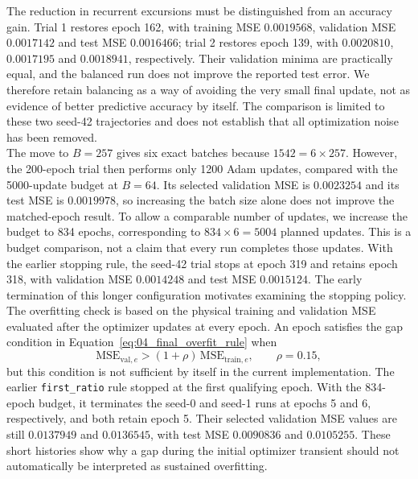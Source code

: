 The reduction in recurrent excursions must be distinguished from an accuracy gain. Trial 1 restores epoch 162, with training MSE $0.0019568$, validation MSE $0.0017142$ and test MSE $0.0016466$; trial 2 restores epoch 139, with $0.0020810$, $0.0017195$ and $0.0018941$, respectively. Their validation minima are practically equal, and the balanced run does not improve the reported test error. We therefore retain balancing as a way of avoiding the very small final update, not as evidence of better predictive accuracy by itself. The comparison is limited to these two seed-42 trajectories and does not establish that all optimization noise has been removed.\\

The move to $B=257$ gives six exact batches because $1542=6\times257$. However, the 200-epoch trial then performs only 1200 Adam updates, compared with the 5000-update budget at $B=64$. Its selected validation MSE is $0.0023254$ and its test MSE is $0.0019978$, so increasing the batch size alone does not improve the matched-epoch result. To allow a comparable number of updates, we increase the budget to 834 epochs, corresponding to $834\times6=5004$ planned updates. This is a budget comparison, not a claim that every run completes those updates. With the earlier stopping rule, the seed-42 trial stops at epoch 319 and retains epoch 318, with validation MSE $0.0014248$ and test MSE $0.0015124$. The early termination of this longer configuration motivates examining the stopping policy.\\

The overfitting check is based on the physical training and validation MSE evaluated after the optimizer updates at every epoch. An epoch satisfies the gap condition in Equation~\eqref{eq:04_final_overfit_rule} when
\begin{equation}
    \mathrm{MSE}_{\mathrm{val},e}
    > (1+\rho)\,\mathrm{MSE}_{\mathrm{train},e},
    \qquad \rho=0.15,
    \label{eq:04_final_overfit_rule}
\end{equation}
but this condition is not sufficient by itself in the current implementation. The earlier \texttt{first\_ratio} rule stopped at the first qualifying epoch. With the 834-epoch budget, it terminates the seed-0 and seed-1 runs at epochs 5 and 6, respectively, and both retain epoch 5. Their selected validation MSE values are still $0.0137949$ and $0.0136545$, with test MSE $0.0090836$ and $0.0105255$. These short histories show why a gap during the initial optimizer transient should not automatically be interpreted as sustained overfitting.\\

